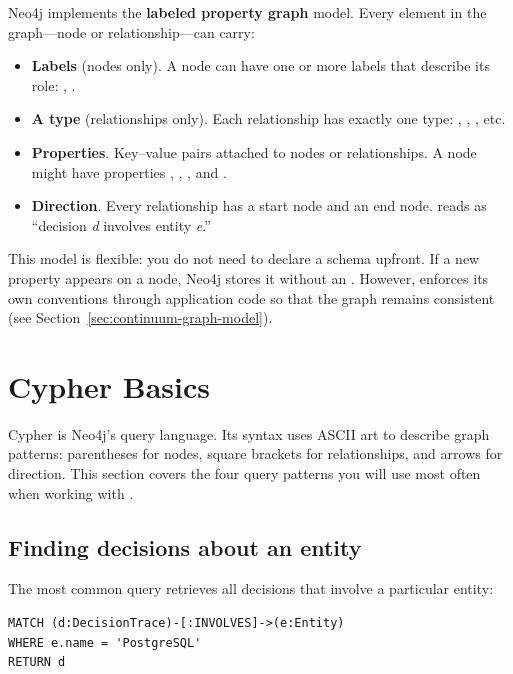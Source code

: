 Neo4j implements the \textbf{labeled property graph} model. Every element in
the graph---node or relationship---can carry:

\begin{itemize}
    \item \textbf{Labels} (nodes only). A node can have one or more labels that
          describe its role: , .
    \item \textbf{A type} (relationships only). Each relationship has exactly
          one type: , , , etc.
    \item \textbf{Properties}. Key--value pairs attached to nodes or
          relationships. A  node might have properties
          , , , and .
    \item \textbf{Direction}. Every relationship has a start node and an end
          node.  reads as
          ``decision \emph{d} involves entity \emph{e}.''
\end{itemize}

This model is flexible: you do not need to declare a schema upfront. If a new
property appears on a node, Neo4j stores it without an .
However, \sysname{} enforces its own conventions through application code so
that the graph remains consistent (see Section~\ref{sec:continuum-graph-model}).

\section{Cypher Basics}
\label{sec:cypher-basics}

Cypher is Neo4j's query language. Its syntax uses ASCII art to describe graph
patterns: parentheses for nodes, square brackets for relationships, and arrows
for direction. This section covers the four query patterns you will use most
often when working with \sysname{}.

\subsection{Finding decisions about an entity}

The most common query retrieves all decisions that involve a particular entity:

\begin{lstlisting}[style=cypher]
MATCH (d:DecisionTrace)-[:INVOLVES]->(e:Entity)
WHERE e.name = 'PostgreSQL'
RETURN d
\end{lstlisting}

